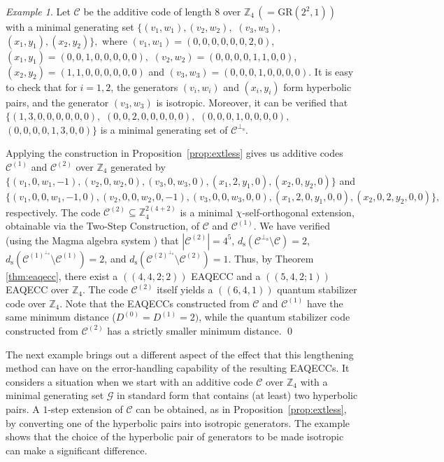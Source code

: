 \documentclass{article}
\theoremstyle{remark}
\newtheorem{ex}{Example}[section]
\theoremstyle{definition}
\numberwithin{equation}{section}
\begin{document}
\begin{ex}Let $\mathcal{C}$ be the additive code of length $8$ over $\mathbb{Z}_4 \, (=\text{GR}(2^2,1))$ with a minimal generating set 
$\{(v_1,w_1),(v_2,w_2), $ $(v_3,w_3),$ $(x_1,y_1),(x_2,y_2)\},$  where
$(v_1,w_1)= (0,0,0,0,0,0,2,0)$, $(x_1,y_1)= (0,0,1,0,0,0,0,0),$ $(v_2,w_2)= (0,0,0,0,1,1,0,0)$, $(x_2,y_2)= (1,1,0,0,0,0,0,0)$ and $(v_3,w_3)=(0,0,0,1,0,0,0,0)$.
 It is easy to check that for $i = 1,2$, the generators $(v_i,w_i)$ and $(x_i,y_i)$ form hyperbolic pairs, and the generator $(v_3,w_3)$ is isotropic. Moreover, it can be verified that $\{(1,3,0,0,0,0,0,0),$ $(0,0,2,0,0,0,0,0),$ $(0,0,0,1,0,0,0,0),$ $(0,0,0,0,1,3,0,0)\}$ is a minimal generating set of  $\mathcal{C}^{\perp_{\mathrm{s}}}$.

Applying the construction in Proposition~\ref{prop:extless} gives us additive codes $\mathcal{C}^{(1)}$ and $\mathcal{C}^{(2)}$ over $\mathbb{Z}_4$ generated by $\{(v_1,0,w_1,-1),(v_2,0,w_2,0),(v_3,0,w_3,0),(x_1,2,y_1,0),(x_2,0,y_2,0)\}$ and  $\{(v_1,0,0,w_1,-1,0),(v_2,0,0,w_2,0,-1),(v_3,0,0,w_3,0,0),(x_1,2,0,y_1,0,0),(x_2,0,2,y_2,0,0)\},$ respectively. The code $\mathcal{C}^{(2)}\subseteq\mathbb{Z}_4^{2(4+2)}$ is a minimal $\chi$-self-orthogonal extension, obtainable via the Two-Step Construction, of $\mathcal{C}$ and $\mathcal{C}^{(1)}$. We have verified (using the Magma algebra system \cite{bosma}) that $|\mathcal{C}^{(2)}| = 4^5$, $d_{\mathrm{s}}(\mathcal{C}^{\perp_{\mathrm{s}}}\setminus \mathcal{C})=2$, $d_{\mathrm{s}}(\mathcal{C}^{(1)^{\perp_{\mathrm{s}}}}\setminus \mathcal{C}^{(1)})=2$, and  $d_{\mathrm{s}}(\mathcal{C}^{(2)^{\perp_{\mathrm{s}}}}\setminus \mathcal{C}^{(2)})=1$.  Thus, by Theorem \ref{thm:eaqecc}, there exist a $((4,4,2;2))$ EAQECC and a $((5,4,2;1))$ EAQECC over $\mathbb{Z}_4$. The code $\mathcal{C}^{(2)}$ itself yields a $((6,4,1))$ quantum stabilizer code over $\mathbb{Z}_4$.  Note that the EAQECCs constructed from $\mathcal{C}$ and $\mathcal{C}^{(1)}$ have the same minimum distance ($D^{(0)} = D^{(1)} = 2)$, while the quantum stabilizer code constructed from $\mathcal{C}^{(2)}$ has a strictly smaller minimum distance. \qed
\end{ex}

\bigskip

The next example brings out a different aspect of the effect that this lengthening method can have on the error-handling capability of the resulting EAQECCs. It considers a situation when we start with an additive code $\mathcal{C}$ over $\mathbb{Z}_4$  with a minimal generating set $\mathcal{G}$ in standard form that contains (at least) two hyperbolic pairs. A $1$-step extension of $\mathcal{C}$ can be obtained, as in Proposition~\ref{prop:extless}, by converting one of the hyperbolic pairs into isotropic generators. The example shows that the choice of the hyperbolic pair of generators to be made isotropic can make a significant difference.
\end{document}
